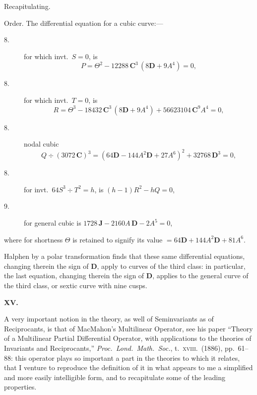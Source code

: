 \documentclass[11pt]{article}
\begin{document}
Recapitulating.

Order. The differential equation for a cubic curve:---
\begin{description}
\item[8.] for which invt.\ $S = 0$, is
\[
P = \Theta^2 - 12288\,\mathbf{C}^3\,(8\mathbf{D} + 9 A^4) = 0,
\]
\item[8.] for which invt.\ $T = 0$, is
\[
R = \Theta^3 - 18432\,\mathbf{C}^3\,(8\mathbf{D} + 9 A^4) + 56623104\,\mathbf{C}^9 A^4 = 0,
\]
\item[8.] nodal cubic
\[
Q \div (3072\,\mathbf{C})^3 = (64\mathbf{D} - 144 A^2\mathbf{D} + 27 A^6)^2 + 32768\,\mathbf{D}^3 = 0,
\]
\item[8.] for invt.\ $64 S^3 \div T^2 = h$, is $(h - 1) R^2 - h Q = 0$,
\item[9.] for general cubic is $1728\,\mathbf{J} - 2160 A\,\mathbf{D} - 2 A^5 = 0$,
\end{description}
where for shortness $\Theta$ is retained to signify its value $= 64\mathbf{D} + 144 A^2\mathbf{D} + 81 A^6$.

Halphen by a polar transformation finds that these same differential equations, changing therein the sign of $\mathbf{D}$, apply to curves of the third class: in particular, the last equation, changing therein the sign of $\mathbf{D}$, applies to the general curve of the third class, or sextic curve with nine cusps.

\medskip
\begin{center}\textbf{XV.}\end{center}

A very important notion in the theory, as well of Seminvariants as of Reciprocants, is that of MacMahon's Multilinear Operator, see his paper ``Theory of a Multilinear Partial Differential Operator, with applications to the theories of Invariants and Reciprocants,'' \textit{Proc.\ Lond.\ Math.\ Soc.}, t.\ \textsc{xviii}.\ (1886), pp.\ 61--88: this operator plays so important a part in the theories to which it relates, that I venture to reproduce the definition of it in what appears to me a simplified and more easily intelligible form, and to recapitulate some of the leading properties.
\end{document}
